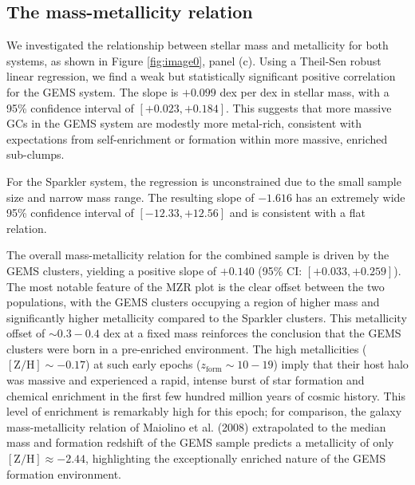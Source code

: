 \documentclass[]{article}
\begin{document}
\subsection{The mass-metallicity relation}

We investigated the relationship between stellar mass and metallicity for both systems, as shown in Figure \ref{fig:image0}, panel (c). Using a Theil-Sen robust linear regression, we find a weak but statistically significant positive correlation for the GEMS system. The slope is $+0.099$ dex per dex in stellar mass, with a 95\% confidence interval of $[+0.023, +0.184]$. This suggests that more massive GCs in the GEMS system are modestly more metal-rich, consistent with expectations from self-enrichment or formation within more massive, enriched sub-clumps.

For the Sparkler system, the regression is unconstrained due to the small sample size and narrow mass range. The resulting slope of $-1.616$ has an extremely wide 95\% confidence interval of $[-12.33, +12.56]$ and is consistent with a flat relation.

The overall mass-metallicity relation for the combined sample is driven by the GEMS clusters, yielding a positive slope of $+0.140$ (95\% CI: $[+0.033, +0.259]$). The most notable feature of the MZR plot is the clear offset between the two populations, with the GEMS clusters occupying a region of higher mass and significantly higher metallicity compared to the Sparkler clusters. This metallicity offset of $\sim 0.3-0.4$ dex at a fixed mass reinforces the conclusion that the GEMS clusters were born in a pre-enriched environment. The high metallicities ($[\mathrm{Z/H}] \sim -0.17$) at such early epochs ($z_\mathrm{form} \sim 10-19$) imply that their host halo was massive and experienced a rapid, intense burst of star formation and chemical enrichment in the first few hundred million years of cosmic history. This level of enrichment is remarkably high for this epoch; for comparison, the galaxy mass-metallicity relation of Maiolino et al. (2008) extrapolated to the median mass and formation redshift of the GEMS sample predicts a metallicity of only $[\mathrm{Z/H}] \approx -2.44$, highlighting the exceptionally enriched nature of the GEMS formation environment.
\end{document}
